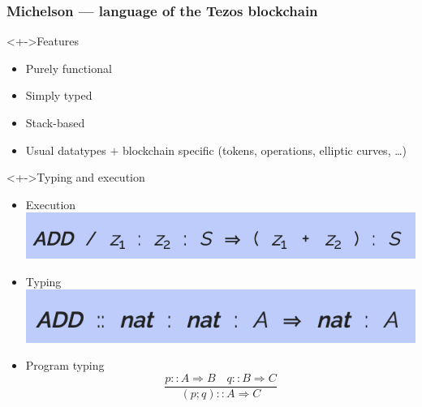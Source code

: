 \documentclass[aspectratio=1610]{beamer}
\begin{document}
\begin{frame}
  \frametitle{Michelson --- language of the Tezos blockchain}
  \begin{block}<+->{Features}
  \begin{itemize}
  \item Purely functional
  \item Simply typed
  \item Stack-based
  \item Usual datatypes $+$ blockchain specific (tokens, operations, elliptic curves, \dots)
  \end{itemize}
\end{block}
\begin{exampleblock}<+->{Typing and execution}
  \begin{itemize}
  \item Execution \hspace{1ex}\includegraphics[scale=0.65]{add-semantics}
  \item Typing\qquad \includegraphics[scale=0.65]{add-typing}
  \item Program typing
    \begin{displaymath}
      \frac{p :: A \Rightarrow B \quad q :: B \Rightarrow C}{(p;q) :: A \Rightarrow C}
    \end{displaymath}
  \end{itemize}
\end{exampleblock}
\end{frame}
\end{document}
